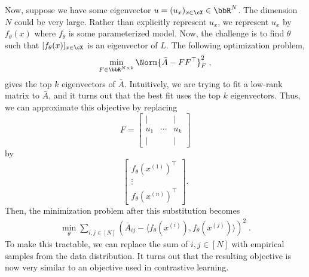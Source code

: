 Now, suppose we have some eigenvector $u = (u_x)_{x \in \cX} \in \bbR^N$. The dimension $N$ could be very large. Rather than explicitly represent $u_x$, we represent $u_x$ by $f_\theta(x)$ where $f_\theta$ is some parameterized model. Now, the challenge is to find $\theta$ such that $[f_\theta(x)]_{x \in \cX}$ is an eigenvector of $L$. The following optimization problem,
\begin{align}
    \min_{F \in \bbR^{N \times k}} \Norm{\bar{A} - F F^\top}^2_F \;,
\end{align}
gives the top $k$ eigenvectors of $\bar{A}$. Intuitively, we are trying to fit a low-rank matrix to $\bar{A}$, and it turns out that the best fit uses the top $k$ eigenvectors. Thus, we can approximate this objective by replacing 
\begin{equation}
    F = \begin{bmatrix} \lvert &  & \lvert \\ u_1 & \cdots &  u_k \\ \lvert &  & \lvert \end{bmatrix}
\end{equation}
by
\begin{equation}
    \begin{bmatrix} f_\theta(x^{(1)})^\top \\ \vdots \\ f_\theta(x^{(n)})^\top \end{bmatrix}.
\end{equation} 
Then, the minimization problem after this substitution becomes
\begin{align}
    \min_\theta \sum_{i, j \in [N]} \left( \bar{A}_{ij} - \langle f_\theta(x^{(i)}), f_\theta(x^{(j)})\rangle \right)^2 \;.
\end{align}
To make this tractable, we can replace the sum of $i, j \in [N]$ with empirical samples from the data distribution. It turns out that the resulting objective is now very similar to an objective used in contrastive learning.



